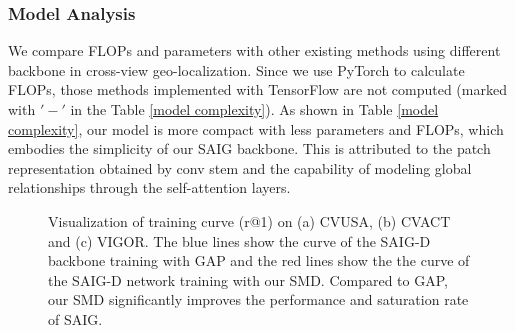 \documentclass[sn-basic,iicol]{sn-jnl}
\theoremstyle{thmstyletwo}\newtheorem{example}{Example}\newtheorem{remark}{Remark}
\theoremstyle{thmstylethree}\newtheorem{definition}{Definition}
\begin{document}
\subsubsection{Model Analysis}

 We compare FLOPs and parameters with other existing methods using different backbone in cross-view geo-localization. Since we use PyTorch to calculate FLOPs, those methods implemented with TensorFlow are not computed (marked with $'-'$ in the Table \ref{model complexity}). As shown in Table \ref{model complexity}, our model is more compact with less parameters and FLOPs, which embodies the simplicity of our SAIG backbone. This is attributed to the patch representation obtained by conv stem and the capability of modeling global relationships through the self-attention layers. 









\begin{figure*}[htbp] \begin{minipage}[t]{0.335\linewidth} \centering

\end{minipage}\begin{minipage}[t]{0.335\linewidth}
\centering
{}
\end{minipage}\begin{minipage}[t]{0.33\linewidth}
\centering
{}
\end{minipage}

\caption{Visualization of training curve (r@1) on (a) CVUSA, (b) CVACT and (c) VIGOR. The blue lines show the curve of the SAIG-D backbone training with GAP and the red lines show the the curve of the SAIG-D network training with our SMD. Compared to GAP, our SMD significantly improves the performance and saturation rate of SAIG.}
\label{pool}
\vspace{-10pt}
\end{figure*}
\end{document}
